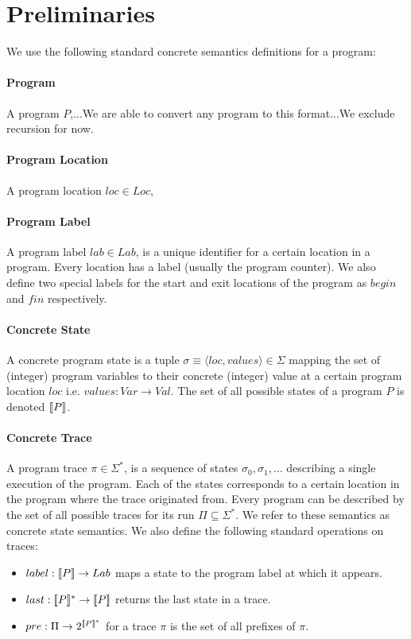 \section{Preliminaries} 
We use the following standard concrete semantics definitions for a program:

\paragraph{Program}  A program $P$,...We are able to convert any program to this format...We exclude recursion for now.

\paragraph{Program Location} 
A program location $loc \in Loc$,

\paragraph{Program Label} 
A program label $lab \in Lab$, is a unique identifier for a certain location in a program. Every location has a label (usually the program counter). We also define two special labels for the start and exit locations of the program as $begin$ and $fin$ respectively.

\paragraph{Concrete State} 
A concrete program state is a tuple $\sigma \equiv \langle loc, values \rangle \in \Sigma$ mapping the set of (integer) program variables to their concrete (integer) value at a certain program location $loc$ i.e. $values : Var \rightarrow Val$. The set of all possible states of a program $P$ is denoted $\lbrack\!\lbrack P \rbrack\!\rbrack$.

\paragraph{Concrete Trace} 
A program trace $\pi \in \Sigma^*$, is a sequence of states $\sigma_0,\sigma_1,...$ describing a single execution of the program. Each of the states corresponds to a certain location in the program where the trace originated from. Every program can be described by the set of all possible traces for its run $\Pi \subseteq \Sigma^*$. We refer to these semantics as concrete state semantics. We also define the following standard operations on traces:
\begin{itemize}
\item $label : \lbrack\!\lbrack P \rbrack\!\rbrack \rightarrow Lab$ maps a state to the program label at which it appears.
\item $last : \lbrack\!\lbrack P \rbrack\!\rbrack^* \rightarrow \lbrack\!\lbrack P \rbrack\!\rbrack$ returns the last state in a trace.
\item $pre : \Pi \rightarrow 2^{\lbrack\!\lbrack P \rbrack\!\rbrack^*}$ for a trace $\pi$ is the set of all prefixes of $\pi$.
\end{itemize}

